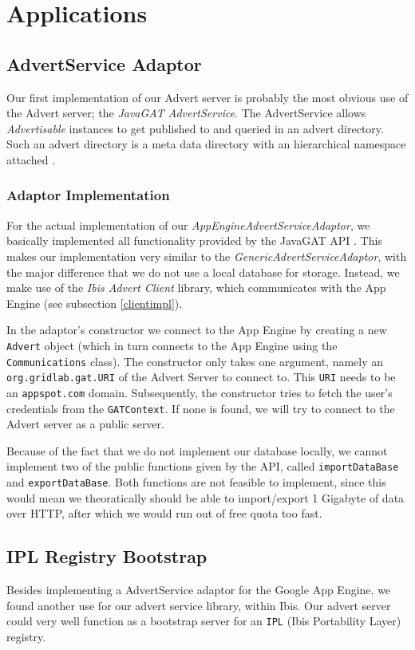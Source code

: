 \section{Applications}
\subsection{AdvertService Adaptor}
\label{advertservice}
Our first implementation of our Advert server is probably the most obvious use
of the Advert server; the \emph{JavaGAT AdvertService}. The AdvertService
allows \emph{Advertisable} instances to get published to and queried in an
advert directory. Such an advert directory is a meta data directory with an
hierarchical namespace attached \cite{javagat-javadoc}.

\subsubsection{Adaptor Implementation}
For the actual implementation of our \emph{AppEngineAdvertServiceAdaptor}, we
basically implemented all functionality provided by the JavaGAT API
\cite{javagat-javadoc}. This makes our implementation very similar to the
\emph{GenericAdvertServiceAdaptor}, with the major difference that we do not
use a local database for storage. Instead, we make use of the \emph{Ibis Advert
Client} library, which communicates with the App Engine (see subsection 
\ref{clientimpl}). 

In the adaptor's constructor we connect to the App Engine by creating a new
\texttt{Advert} object (which in turn connects to the App Engine using the
\texttt{Communications} class). The constructor only takes one argument, namely
an \texttt{org.gridlab.gat.URI} of the Advert Server to connect to. This
\texttt{URI} needs to be an \texttt{appspot.com} domain. Subsequently, the
constructor tries to fetch the user's credentials from the \texttt{GATContext}. 
If none is found, we will try to connect to the Advert server as a public
server.

Because of the fact that we do not implement our database locally, we cannot
implement two of the public functions given by the API, called
\texttt{importDataBase} and \texttt{exportDataBase}. Both functions are not
feasible to implement, since this would mean we theoratically should be able to
import/export 1 Gigabyte of data over HTTP, after which we would run out of
free quota too fast.

\subsection{IPL Registry Bootstrap}
\label{ipl}
Besides implementing a AdvertService adaptor for the Google App Engine, we
found another use for our advert service library, within Ibis. Our advert
server could very well function as a bootstrap server for an \texttt{IPL} (Ibis
Portability Layer) \cite{ipl-www} registry.

